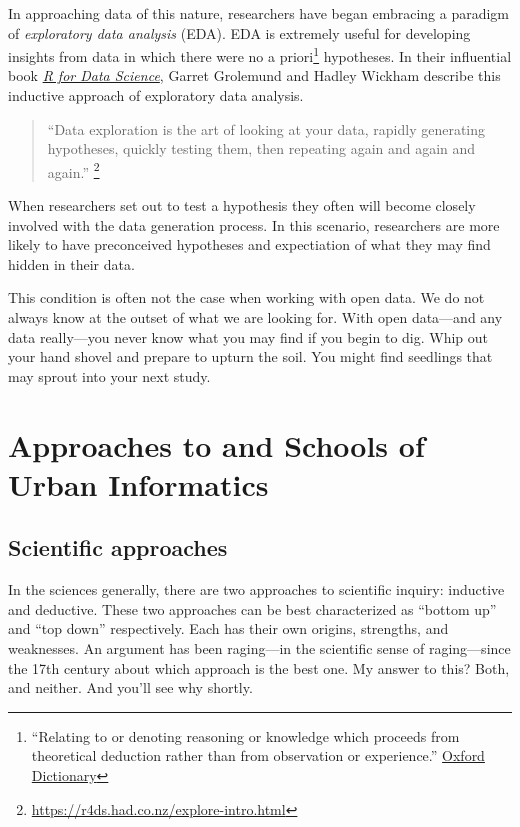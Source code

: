 \documentclass[
]{book}
\begin{document}
In approaching data of this nature, researchers have began embracing a paradigm of \emph{exploratory data analysis} (EDA). EDA is extremely useful for developing insights from data in which there were no a priori\footnote{``Relating to or denoting reasoning or knowledge which proceeds from theoretical deduction rather than from observation or experience.'' \href{https://www.lexico.com/definition/a_priori}{Oxford Dictionary}} hypotheses. In their influential book \href{https://r4ds.had.co.nz}{\emph{R for Data Science}}, Garret Grolemund and Hadley Wickham describe this inductive approach of exploratory data analysis.

\begin{quote}
``Data exploration is the art of looking at your data, rapidly generating hypotheses, quickly testing them, then repeating again and again and again.'' \footnote{\url{https://r4ds.had.co.nz/explore-intro.html}}
\end{quote}

When researchers set out to test a hypothesis they often will become closely involved with the data generation process. In this scenario, researchers are more likely to have preconceived hypotheses and expectiation of what they may find hidden in their data.

This condition is often not the case when working with open data. We do not always know at the outset of what we are looking for. With open data---and any data really---you never know what you may find if you begin to dig. Whip out your hand shovel and prepare to upturn the soil. You might find seedlings that may sprout into your next study.

\hypertarget{approaches-to-and-schools-of-urban-informatics}{%
\chapter{Approaches to and Schools of Urban Informatics}\label{approaches-to-and-schools-of-urban-informatics}}

\hypertarget{scientific-approaches}{%
\section{Scientific approaches}\label{scientific-approaches}}

In the sciences generally, there are two approaches to scientific inquiry: inductive and deductive. These two approaches can be best characterized as ``bottom up'' and ``top down'' respectively. Each has their own origins, strengths, and weaknesses. An argument has been raging---in the scientific sense of raging---since the 17th century about which approach is the best one. My answer to this? Both, and neither. And you'll see why shortly.
\end{document}
